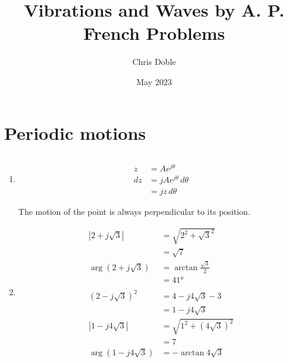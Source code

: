 \documentclass{article}
\title{Vibrations and Waves by A. P. French Problems}
\author{Chris Doble}
\date{May 2023}
\begin{document}
\maketitle

\tableofcontents

\section{Periodic motions}

\setcounter{subsection}{3}
\subsection{}

\begin{enumerate}
  \item

        \begin{align*}
          z   & = A e^{j \theta}              \\
          d z & = j A e^{j \theta} \,d \theta \\
              & = j z \,d \theta
        \end{align*}

        The motion of the point is always perpendicular to its position.

  \item

        \begin{align*}
          |2 + j \sqrt{3}|        & = \sqrt{2^2 + \sqrt{3}^2}     \\
                                  & = \sqrt{7}                    \\
          \arg (2 + j \sqrt{3})   & = \arctan \frac{\sqrt{3}}{2}  \\
                                  & = \ang{41}                    \\ \\
          (2 - j \sqrt{3})^2      & = 4 - j 4 \sqrt{3} - 3        \\
                                  & = 1 - j 4 \sqrt{3}            \\
          |1 - j 4 \sqrt{3}|      & = \sqrt{1^2 + (4 \sqrt{3})^2} \\
                                  & = 7                           \\
          \arg (1 - j 4 \sqrt{3}) & = -\arctan 4 \sqrt{3}
        \end{align*}
\end{enumerate}
\end{document}
